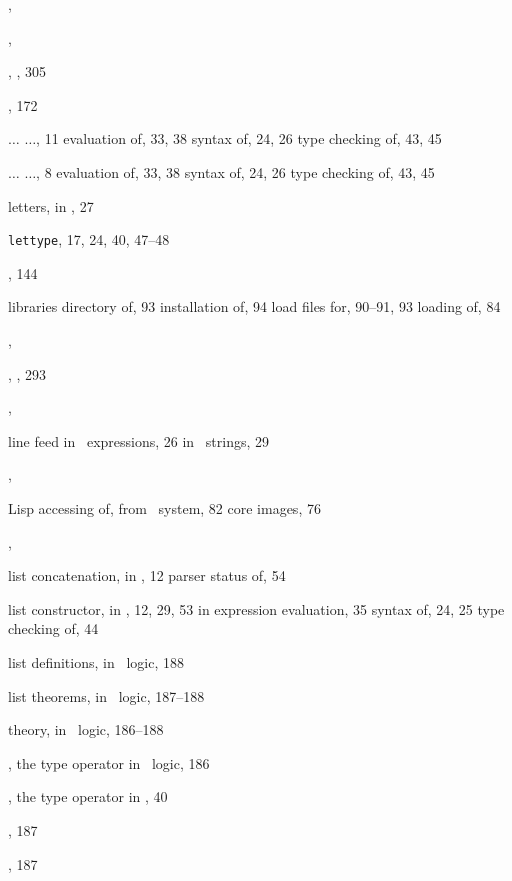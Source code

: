 \begin{theindex}
  \item {}, 
  \item {}, 
  \item {}, , 305
  \item {}, 172
  \item {} $\ldots$  $\ldots$, 11
    \subitem evaluation of, 33, 38
    \subitem syntax of, 24, 26
    \subitem type checking of, 43, 45
  \item {} $\ldots$  $\ldots$, 8
    \subitem evaluation of, 33, 38
    \subitem syntax of, 24, 26
    \subitem type checking of, 43, 45
  \item letters, in \ML, 27
  \item {\small\verb+lettype+}, 17, 24, 40, 47--48
  \item {}, 144
  \item libraries
    \subitem directory of, 93
    \subitem installation of, 94
    \subitem load files for, 90--91, 93
    \subitem loading of, 84
  \item {}, 
  \item {}, , 293
  \item {}, 
  \item line feed
    \subitem in \ML\ expressions, 26
    \subitem in \ML\ strings, 29
  \item {}, 
  \item Lisp
    \subitem accessing of, from \HOL\ system, 82
    \subitem core images, 76
  \item {}, 
  \item list concatenation, in \ML, 12
    \subitem parser status of, 54
  \item list constructor, in \ML, 12, 29, 53
    \subitem in expression evaluation, 35
    \subitem syntax of, 24, 25
    \subitem type checking of, 44
  \item list definitions, in \HOL\ logic, 188
  \item list theorems, in \HOL\ logic, 187--188
  \item {} theory, in \HOL\ logic, 186--188
  \item {}, the type operator in \HOL\ logic, 186
  \item {}, the type operator in \ML, 40
  \item {}, 187
  \item {}, 187

\end{theindex}
